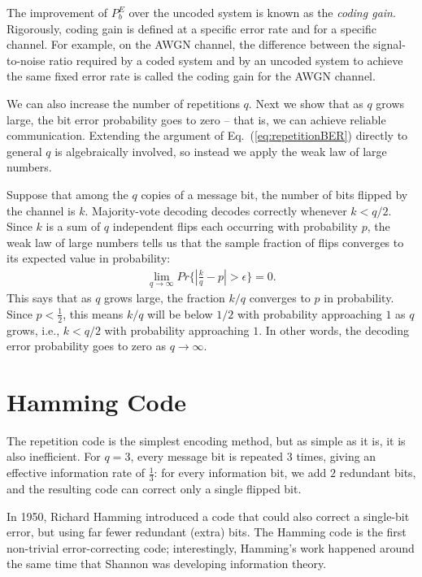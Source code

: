 The improvement of \(P_b^{E}\) over the uncoded system is known as the \emph{coding gain}. Rigorously, coding gain is defined at a specific error rate and for a specific channel. For example, on the AWGN channel, the difference between the signal-to-noise ratio required by a coded system and by an uncoded system to achieve the same fixed error rate is called the coding gain for the AWGN channel.


We can also increase the number of repetitions \(q\). Next we show that as \(q\) grows large, the bit error probability goes to zero -- that is, we can achieve reliable communication. Extending the argument of Eq.~(\ref{eq:repetitionBER}) directly to general \(q\) is algebraically involved, so instead we apply the weak law of large numbers.

Suppose that among the \(q\) copies of a message bit, the number of bits flipped by the channel is \(k\). Majority-vote decoding decodes correctly whenever \(k < q/2\). Since \(k\) is a sum of \(q\) independent flips each occurring with probability \(p\), the weak law of large numbers tells us that the sample fraction of flips converges to its expected value in probability:
\begin{align*}
    \lim_{q \to \infty} Pr\{|\frac{k}{q} - p| > \epsilon\} = 0.
\end{align*}
 This says that as \(q\) grows large, the fraction \(k/q\) converges to \(p\) in probability. Since \(p < \frac{1}{2}\), this means \(k/q\) will be below \(1/2\) with probability approaching \(1\) as \(q\) grows, i.e., \(k < q/2\) with probability approaching \(1\). In other words, the decoding error probability goes to zero as \(q \to \infty\).



\section{Hamming Code}
The repetition code is the simplest encoding method, but as simple as it is, it is also inefficient. For \(q=3\), every message bit is repeated \(3\) times, giving an effective information rate of \(\frac{1}{3}\): for every information bit, we add \(2\) redundant bits, and the resulting code can correct only a single flipped bit.

In 1950, Richard Hamming introduced a code that could also correct a single-bit error, but using far fewer redundant (extra) bits. The Hamming code is the first non-trivial error-correcting code; interestingly, Hamming's work happened around the same time that Shannon was developing information theory. 

